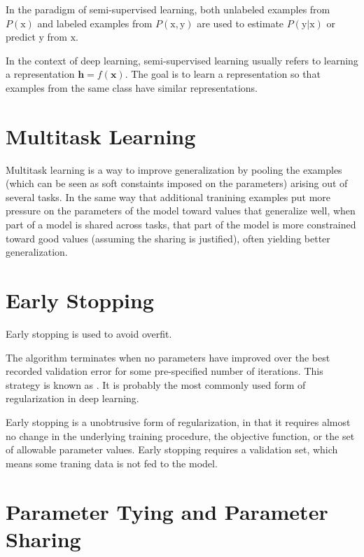 In the paradigm of semi-supervised learning, both unlabeled examples from $P(\mathrm{x})$ and labeled examples from $P(\mathrm{x,y})$ are used to estimate $P(\mathrm{y|x})$ or predict $\mathrm{y}$ from $\mathrm{x}$.


In the context of deep learning, semi-supervised learning usually refers to learning a representation $\bm{h} = f(\bm{x})$. The goal is to learn a representation so that examples from the same class have similar representations.



\section{Multitask Learning}


Multitask learning is a way to improve generalization by pooling the examples (which can be seen as soft constaints imposed on the parameters) arising out of several tasks.
In the same way that additional tranining examples put more pressure on the parameters of the model toward values that generalize well, when part of a model is shared across tasks, that part of the model is more constrained toward good values (assuming the sharing is justified), often yielding better generalization.



\section{Early Stopping}

Early stopping is used to avoid overfit.

The algorithm terminates when no parameters have improved over the best recorded validation error for some pre-specified number of iterations.
This strategy is known as .
It is probably the most commonly used form of regularization in deep learning.


Early stopping is a unobtrusive form of regularization, in that it requires almost no change in the underlying training procedure, the objective function, or the set of allowable parameter values.
Early stopping requires a validation set, which means some traning data is not fed to the model.



\section{Parameter Tying and Parameter Sharing}

